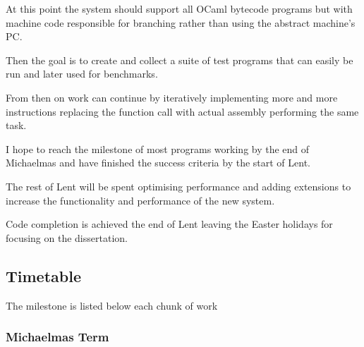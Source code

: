 \documentclass[12pt,a4paper, headings=standardclasses]{scrartcl}
\begin{document}
At this point the system should support all OCaml bytecode programs but with
machine code responsible for branching rather than using the abstract
machine's PC.

Then the goal is to create and collect a suite of test programs that can
easily be run and later used for benchmarks.

From then on work can continue by iteratively implementing more and more
instructions replacing the function call with actual assembly performing the
same task.

I hope to reach the milestone of most programs working by the end of Michaelmas
and have finished the success criteria by the start of Lent.

The rest of Lent will be spent optimising performance and adding extensions to
increase the functionality and performance of the new system.

Code completion is achieved the end of Lent leaving the Easter holidays for
focusing on the dissertation.

\subsection*{Timetable}

The milestone is listed below each chunk of work

\subsubsection*{Michaelmas Term}
\end{document}
